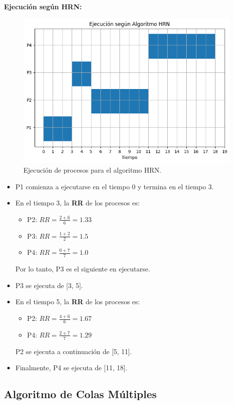 \textbf{Ejecución según HRN:}

\begin{figure}[H]
	\centering
	\includegraphics[width=0.8\linewidth]{Imagenes/ejecucion_hrn.png}
	\caption{Ejecución de procesos para el algoritmo HRN.}
\end{figure}


\begin{itemize}
	\item P1 comienza a ejecutarse en el tiempo 0 y termina en el tiempo 3.
	\item En el tiempo 3, la \textbf{RR} de los procesos es:
	\begin{itemize}
		\item P2: \( RR = \frac{2 + 6}{6} = 1.33 \)
		\item P3: \( RR = \frac{1 + 2}{2} = 1.5 \)
		\item P4: \( RR = \frac{0 + 7}{7} = 1.0 \)
	\end{itemize}
	Por lo tanto, P3 es el siguiente en ejecutarse.
	\item P3 se ejecuta de [3, 5].
	\item En el tiempo 5, la \textbf{RR} de los procesos es:
	\begin{itemize}
		\item P2: \( RR = \frac{4 + 6}{6} = 1.67 \)
		\item P4: \( RR = \frac{2 + 7}{7} = 1.29 \)
	\end{itemize}
	P2 se ejecuta a continuación de [5, 11].
	\item Finalmente, P4 se ejecuta de [11, 18].
\end{itemize}


\subsection{Algoritmo de Colas Múltiples}

